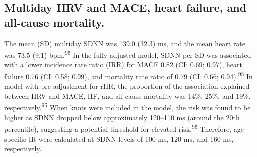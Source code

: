 \documentclass[
  a4paper,
  headsepline=true,
  open=left]{scrbook}
\begin{document}
\restoregeometry

\hypertarget{multiday-hrv-and-mace-heart-failure-and-all-cause-mortality.}{%
\subsection{Multiday HRV and MACE, heart failure, and all-cause
mortality.}\label{multiday-hrv-and-mace-heart-failure-and-all-cause-mortality.}}

The mean (SD) multiday SDNN was 139.0 (32.3) ms, and the mean heart rate
was 73.5 (9.1) bpm.\textsuperscript{95} In the fully adjusted model,
SDNN per SD was associated with a lower incidence rate ratio (IRR) for
MACE 0.82 (CI: 0.69; 0.97), heart failure 0.76 (CI: 0.58; 0.99), and
mortality rate ratio of 0.79 (CI: 0.66; 0.94).\textsuperscript{95} In
model with pre-adjustment for rHR, the proportion of the association
explained between HRV and MACE, HF, and all-cause mortality was 14\%,
25\%, and 19\%, respectively.\textsuperscript{95} When knots were
included in the model, the risk was found to be higher as SDNN dropped
below approximately 120--110 ms (around the 20th percentile), suggesting
a potential threshold for elevated risk.\textsuperscript{95} Therefore,
age-specific IR were calculated at SDNN levels of 100 ms, 120 ms, and
160 ms, respectively.

\end{document}
